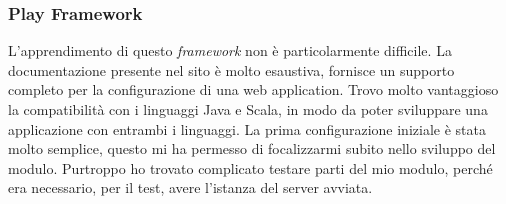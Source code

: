 \subsubsection{Play Framework}
L'apprendimento di questo \emph{framework} non è particolarmente difficile. La documentazione presente nel sito è molto esaustiva, fornisce un supporto completo per la configurazione di una web application. Trovo molto vantaggioso la compatibilità con i linguaggi Java e Scala, in modo da poter sviluppare una applicazione con entrambi i linguaggi. La prima configurazione iniziale è stata molto semplice, questo mi ha permesso di focalizzarmi subito nello sviluppo del modulo. Purtroppo ho trovato complicato testare parti del mio modulo, perché  era necessario, per il test, avere l'istanza del server avviata.




\newpage
